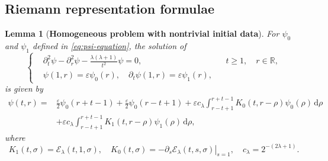 \documentclass[11pt,twoside]{article}
\newcommand{\R}{\mathbb R}
\newcommand{\p}{\partial}
\newcommand{\ve}{\varepsilon}
\newcommand{\f}{\frac}
\newcommand{\dd}{\,\mathrm{d}}
\newcommand{\Ecal}{\mathcal E}
\theoremstyle{plain}
\newtheorem{lemma}[theorem]{Lemma}
\theoremstyle{definition}
\theoremstyle{remark}
\numberwithin{equation}{section}
\begin{document}
\subsection{Riemann representation formulae}


\begin{lemma}[{\bf Homogeneous problem with nontrivial initial data}]
\label{lem:homogeneous-representation}
For $\psi_0$ and $\psi_1$ defined in \eqref{eq:psi-equation},  the solution of
\begin{equation}
\label{eq:hom-linear}
\left\{
\begin{aligned}
&\p_t^2\psi-\p_r^2\psi-\f{\lambda(\lambda+1)}{t^2}\psi=0,
&&t\geq1,\quad r\in\R,\\
&\psi(1,r)=\ve\psi_0(r),\quad
\p_t\psi(1,r)=\ve\psi_1(r),
\end{aligned}
\right.
\end{equation}
is given by
\begin{equation}
\label{eq:hom-representation}
\begin{aligned}
\psi(t,r)={}&\f{\ve}{2}\psi_0(r+t-1)+\f{\ve}{2}\psi_0(r-t+1)
+\ve c_\lambda\int_{r-t+1}^{r+t-1}K_0(t,r-\rho)\psi_0(\rho)\dd\rho\\
&+\ve c_\lambda\int_{r-t+1}^{r+t-1}K_1(t,r-\rho)\psi_1(\rho)\dd\rho,
\end{aligned}
\end{equation}
where
\begin{equation}
\label{eq:K01}
K_1(t,\sigma)=\Ecal_\lambda(t,1,\sigma),\quad
K_0(t,\sigma)=-\left.\p_s\Ecal_\lambda(t,s,\sigma)\right|_{s=1},
\quad
c_\lambda=2^{-(2\lambda+1)}.
\end{equation}
\end{lemma}
\end{document}
